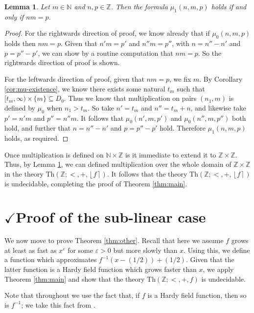 \documentclass{amsart}
\newtheorem{lemma}[theorem]{Lemma}
\theoremstyle{definition}
\newcommand{\nint}[1]{\left\lfloor #1 \right\rceil}
\newcommand{\e}{\varepsilon}
\newcommand{\NN}{\mathbb{N}}
\newcommand{\ZZ}{\mathbb{Z}}
\newcommand{\theory}[1]{\mathrm{Th}(#1)}
\newcommand{\inv}[1]{#1^{-1}}
\begin{document}
\begin{lemma}
\label{lem:general-multiplication}
Let $m \in \NN$ and $n,p \in \ZZ$. Then the formula $\mu_1(n,m,p)$ holds if and only if $nm = p$.
\end{lemma}
\begin{proof}
For the rightwards direction of proof, we know already that if $\mu_0(n,m,p)$ holds then $nm = p$. Given that $n'm = p'$ and $n''m=p''$, with $n = n''-n'$ and $p = p''-p'$, we can show by a routine computation that $nm = p$. So the rightwards direction of proof is shown.

For the leftwards direction of proof, given that $nm = p$, we fix $m$. By Corollary \ref{cor:mu-existence}, we know there exists some natural $t_m$ such that $[t_m, \infty) \times \{m\} \subseteq D_0$. Thus we know that multiplication on pairs $(n_1,m)$ is defined by $\mu_0$ when $n_1 > t_m$. So take $n' = t_m$ and $n'' = t_m + n$, and likewise take $p' = n'm$ and $p'' = n''m$. It follows that $\mu_0(n',m,p')$ and $\mu_0(n'',m,p'')$ both hold, and further that $n = n''-n'$ and $p = p''-p'$ hold. Therefore $\mu_1(n,m,p)$ holds, as required.
\end{proof}

Once multiplication is defined on $\NN \times \ZZ$ is it immediate to extend it to $\ZZ \times \ZZ$. Thus, by Lemma \ref{lem:general-multiplication}, we can defined multiplication over the whole domain of $\ZZ \times \ZZ$ in the theory $\theory{\ZZ; <, +, \nint{f}}$. It follows that the theory $\theory{\ZZ; <, +, \nint{f}}$ is undecidable, completing the proof of Theorem \ref{thm:main}.
 


\section{$\checkmark$Proof of the sub-linear case}

We now move to prove Theorem \ref{thm:other}. Recall that here we assume $f$ grows at least as fast as $x^\e$ for some $\e > 0$ but more slowly than $x$. Using this, we define a function which approximates $\inv{f}(x-(1/2))+(1/2)$. Given that the latter function is a Hardy field function which grows faster than $x$, we apply Theorem \ref{thm:main} and show that the theory $\theory{\ZZ; <, +, f}$ is undecidable.

Note that throughout we use the fact that, if $f$ is a Hardy field function, then so is $\inv{f}$; we take this fact from \cite[Theorem 1.7]{AD-2004}.
\end{document}
